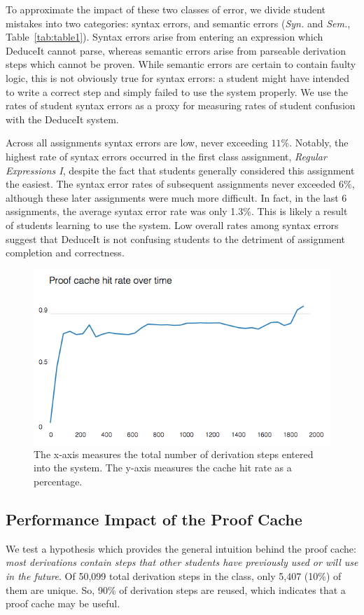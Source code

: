 \documentclass{sigchi}
\begin{document}
To approximate the impact of these two classes of error, we divide student mistakes into two categories: syntax errors, and semantic errors (\textit{Syn.} and \textit{Sem.}, Table~\ref{tab:table1}). Syntax errors arise from entering an expression which DeduceIt cannot parse, whereas semantic errors arise from parseable derivation steps which cannot be proven. While semantic errors are certain to contain faulty logic, this is not obviously true for syntax errors: a student might have intended to write a correct step and simply failed to use the system properly. We use the rates of student syntax errors as a proxy for measuring rates of student confusion with the DeduceIt system.

Across all assignments syntax errors are low, never exceeding $11\%$. Notably, the highest rate of syntax errors occurred in the first class assignment, \textit{Regular Expressions I}, despite the fact that students generally considered this assignment the easiest. The syntax error rates of subsequent assignments never exceeded $6\%$, although these later assignments were much more difficult. In fact, in the last 6 assignments, the average syntax error rate was only 1.3\%. This is likely a result of students learning to use the system. Low overall rates among syntax errors suggest that DeduceIt is not confusing students to the detriment of assignment completion and correctness.

\begin{figure}[tb]
\centering
\includegraphics[width=1\columnwidth]{cache}
\caption{The x-axis measures the total number of derivation steps entered into the system. The y-axis measures the cache hit rate as a percentage.}
\label{fig:proofcache}
\end{figure}

\subsection{Performance Impact of the Proof Cache}
We test a hypothesis which provides the general intuition behind the proof cache: \textit{most derivations contain steps that other students have previously used or will use in the future}. Of 50,099 total derivation steps in the class, only 5,407 (10\%) of them are unique. So, 90\% of derivation steps are reused, which indicates that a proof cache may be useful.
\end{document}
